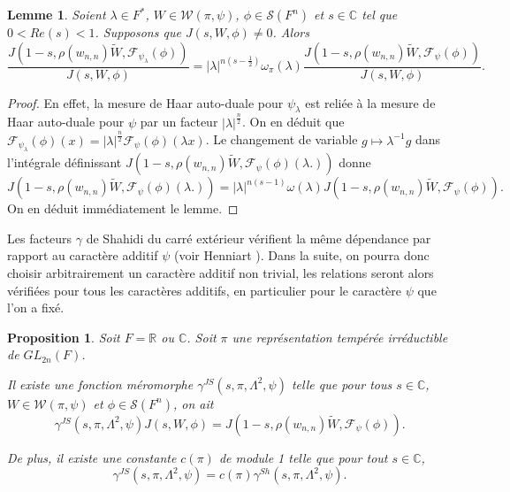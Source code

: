\documentclass{amsart}
\newtheorem{proposition}{Proposition}[section]
\newtheorem{lemme}{Lemme}[section]
\begin{document}
 \begin{lemme}
 \label{depcaradd}
 Soient $\lambda \in F^*$, $W \in \mathcal{W}(\pi, \psi)$, $\phi \in \mathcal{S}(F^n)$ et $s \in \mathbb{C}$ tel que $0 < Re(s) < 1$. Supposons que $J(s, W, \phi) \neq 0$. Alors
 \begin{equation}
 \frac{J(1-s, \rho(w_{n,n})\tilde{W}, \mathcal{F}_{\psi_\lambda}(\phi))}{J(s, W, \phi)} =  |\lambda|^{n(s-\frac{1}{2})}\omega_\pi(\lambda)\frac{J(1-s, \rho(w_{n,n})\tilde{W}, \mathcal{F}_\psi(\phi))}{J(s, W, \phi)} .
 \end{equation}
 \end{lemme}
 
 \begin{proof}
 En effet, la mesure de Haar auto-duale pour $\psi_\lambda$ est reliée à la mesure de Haar auto-duale pour $\psi$ par un facteur $|\lambda|^{\frac{n}{2}}$. On en déduit que $\mathcal{F}_{\psi_\lambda}(\phi)(x) = |\lambda|^{\frac{n}{2}}\mathcal{F}_\psi(\phi)(\lambda x)$. Le changement de variable $g \mapsto \lambda^{-1} g$ dans l'intégrale définissant $J(1-s, \rho(w_{n,n})\tilde{W}, \mathcal{F}_\psi(\phi)(\lambda .))$ donne
 \begin{equation}
 J(1-s, \rho(w_{n,n})\tilde{W}, \mathcal{F}_\psi(\phi)(\lambda.)) = |\lambda|^{n(s-1)}\omega(\lambda)J(1-s, \rho(w_{n,n})\tilde{W}, \mathcal{F}_\psi(\phi)).
 \end{equation}
 On en déduit immédiatement le lemme.
 \end{proof}
 
 Les facteurs $\gamma$ de Shahidi du carré extérieur vérifient la même dépendance par rapport au caractère additif $\psi$ (voir Henniart \cite{henniart}). Dans la suite, on pourra donc choisir arbitrairement un caractère additif non trivial, les relations seront alors vérifiées pour tous les caractères additifs, en particulier pour le caractère $\psi$ que l'on a fixé.
 
 \begin{proposition}
 \label{proparch}
 Soit $F = \mathbb{R}$ ou $\mathbb{C}$. Soit $\pi$ une représentation tempérée irréductible de $GL_{2n}(F)$. 
 
 Il existe une fonction méromorphe $\gamma^{JS}(s,\pi,\Lambda^2,\psi)$ telle que pour tous $s \in \mathbb{C}$, $W \in \mathcal{W}(\pi, \psi)$ et $\phi \in \mathcal{S}(F^n)$, on ait
 \begin{equation}
 \gamma^{JS}(s, \pi, \Lambda^2, \psi) J(s, W, \phi) = J(1-s, \rho(w_{n,n})\tilde{W}, \mathcal{F}_\psi(\phi)).
 \end{equation}
 
 De plus, il existe une constante $c(\pi)$ de module 1 telle que pour tout $s \in \mathbb{C}$,
 \begin{equation}
 \gamma^{JS}(s, \pi, \Lambda^2, \psi) = c(\pi)\gamma^{Sh}(s, \pi, \Lambda^2, \psi).
 \end{equation}
 \end{proposition}
 
\end{document}
